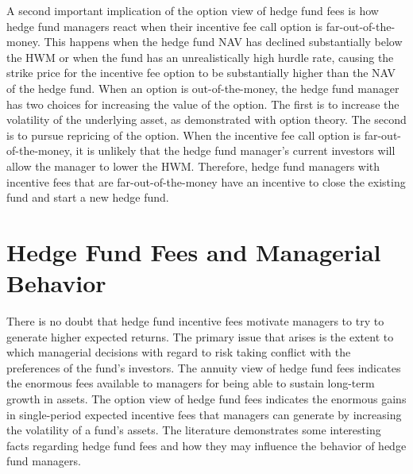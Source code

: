 \documentclass[11pt]{article}
\begin{document}
A second important implication of the option view of hedge fund fees is how hedge fund managers react when their incentive fee call option is far-out-of-the-money. This happens when the hedge fund NAV has declined substantially below the HWM or when the fund has an unrealistically high hurdle rate, causing the strike price for the incentive fee option to be substantially higher than the NAV of the hedge fund. When an option is out-of-the-money, the hedge fund manager has two choices for increasing the value of the option. The first is to increase the volatility of the underlying asset, as demonstrated with option theory. The second is to pursue repricing of the option. When the incentive fee call option is far-out-of-the-money, it is unlikely that the hedge fund manager's current investors will allow the manager to lower the HWM. Therefore, hedge fund managers with incentive fees that are far-out-of-the-money have an incentive to close the existing fund and start a new hedge fund.

\section*{Hedge Fund Fees and Managerial Behavior}
There is no doubt that hedge fund incentive fees motivate managers to try to generate higher expected returns. The primary issue that arises is the extent to which managerial decisions with regard to risk taking conflict with the preferences of the fund's investors. The annuity view of hedge fund fees indicates the enormous fees available to managers for being able to sustain long-term growth in assets. The option view of hedge fund fees indicates the enormous gains in single-period expected incentive fees that managers can generate by increasing the volatility of a fund's assets. The literature demonstrates some interesting facts regarding hedge fund fees and how they may influence the behavior of hedge fund managers.
\end{document}
